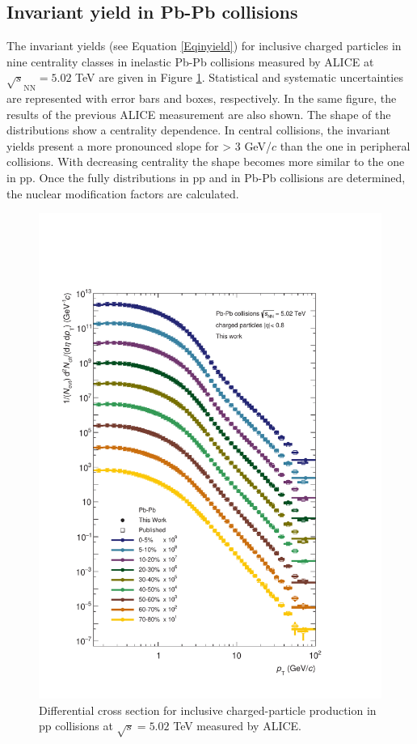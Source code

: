 \documentclass[12pt,a4paper]{report}
\begin{document}
\subsection{Invariant yield in Pb-Pb collisions}
The invariant yields (see Equation \ref{Eqinyield}) for inclusive charged particles in nine centrality classes in inelastic Pb-Pb collisions measured by ALICE at $\sqrt{s}_\text{NN}=5.02$ TeV are given in Figure \ref{invYield}. Statistical and systematic uncertainties are represented with error bars and boxes, respectively. In the same figure, the results of the previous ALICE measurement are also shown. The shape of the \pt distributions show a centrality dependence. In central collisions, the invariant yields present a more pronounced slope for \pt > 3 GeV/$c$ than the one in peripheral collisions. With decreasing centrality the shape becomes more similar to the one in pp. Once the fully \pt distributions in pp and in Pb-Pb collisions are determined, the nuclear modification factors are calculated.
\begin{figure}[tb!]
\centering
\includegraphics[width=12cm]{Plots/invYieldPbPb.pdf}  
\caption{Differential cross section for inclusive charged-particle production in pp collisions at $\sqrt{s}=5.02$ TeV measured by ALICE.}
\label{invYield}
\end{figure}
\end{document}
